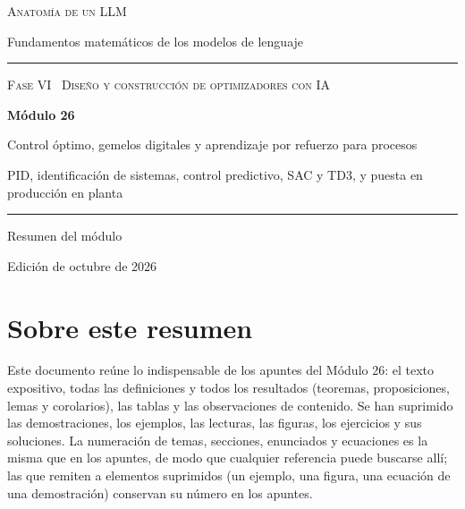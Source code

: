 \documentclass[11pt,a4paper,twoside,openany]{book}
\begin{document}
\frontmatter
\begin{titlepage}
\centering
\vspace*{2.5cm}
{\large\scshape Anatomía de un LLM}\par
\vspace{0.4cm}
{\normalsize Fundamentos matemáticos de los modelos de lenguaje}\par
\vspace{2.2cm}
\rule{\textwidth}{0.8pt}\par\vspace{0.5cm}
{\small\scshape Fase VI \textperiodcentered\ Diseño y construcción de optimizadores con IA}\par\vspace{0.3cm}
{\Huge\bfseries Módulo 26\par}\vspace{0.3cm}
{\LARGE Control óptimo, gemelos digitales y aprendizaje por refuerzo para procesos\par}
\vspace{0.2cm}
{\large PID, identificación de sistemas, control predictivo, SAC y TD3, y puesta en producción en planta\par}
\vspace{0.5cm}\rule{\textwidth}{0.4pt}\par
\vspace{1.6cm}
{\large Resumen del módulo}\par
\vfill
{\small Edición de octubre de 2026}\par
\end{titlepage}

\chapter*{Sobre este resumen}

Este documento reúne lo indispensable de los apuntes del Módulo 26: el texto expositivo, todas las definiciones y todos los resultados (teoremas, proposiciones, lemas y corolarios), las tablas y las observaciones de contenido. Se han suprimido las demostraciones, los ejemplos, las lecturas, las figuras, los ejercicios y sus soluciones. La numeración de temas, secciones, enunciados y ecuaciones es la misma que en los apuntes, de modo que cualquier referencia puede buscarse allí; las que remiten a elementos suprimidos (un ejemplo, una figura, una ecuación de una demostración) conservan su número en los apuntes.
\end{document}
